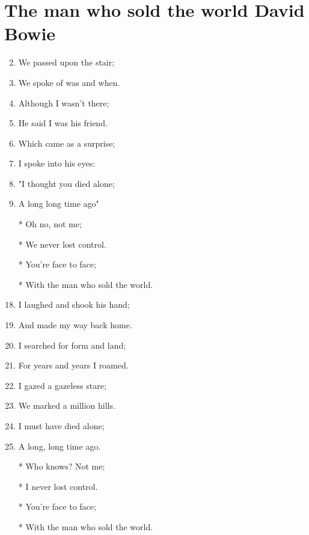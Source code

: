 \documentclass{article}
\begin{document}
    
    \section*{The man who sold the world \of David Bowie}

    \begin{center}
        \begin{enumerate}

            \item[] 
            \item We passed upon the stair;
            \item We spoke of was and when.
            \item Although I wasn't there;
            \item He said I was his friend.
            \item Which came as a surprise;
            \item I spoke into his eyes:
            \item "I thought you died alone;
            \item A long long time ago"
            
            \item[]

            \item[] \chorus{}
            \item[*] Oh no, not me;
            \item[*] We never lost control.
            \item[*] You're face to face;
            \item[*] With the man who sold the world.
            
            \item[]

            \item[] 
            \item I laughed and shook his hand;
            \item And made my way back home.
            \item I searched for form and land;
            \item For years and years I roamed.
            \item I gazed a gazeless stare;
            \item We marked a million hills.
            \item I must have died alone;
            \item A long, long time ago.
            
            \item[]

            \item[] 
            \item[*] Who knows? Not me;
            \item[*] I never lost control.
            \item[*] You're face to face;
            \item[*] With the man who sold the world.

        \end{enumerate}
    \end{center}
\end{document}
